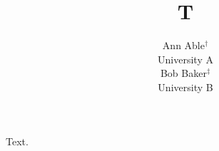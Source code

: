 \documentclass{article}
\begin{document}
\title{T}
\author{Ann Able$^{\dag}$\\ University A\\ Bob Baker$^{\ddag}$\\ University B}
\maketitle
Text.
\end{document}
